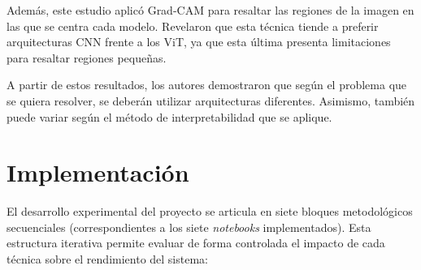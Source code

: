\documentclass[11pt, a4paper]{article}
\numberwithin{equation}{section}
\begin{document}
Además, este estudio aplicó Grad-CAM para resaltar las regiones de la imagen en las que se centra cada modelo. Revelaron que esta técnica tiende a preferir arquitecturas CNN frente a los ViT, ya que esta última presenta limitaciones para resaltar regiones pequeñas.

A partir de estos resultados, los autores demostraron que según el problema que se quiera resolver, se deberán utilizar arquitecturas diferentes. Asimismo, también puede variar según el método de interpretabilidad que se aplique.


\newpage
\section{Implementación}

El desarrollo experimental del proyecto se articula en siete bloques metodológicos secuenciales (correspondientes a los siete \textit{notebooks} implementados). Esta estructura iterativa permite evaluar de forma controlada el impacto de cada técnica sobre el rendimiento del sistema:
\end{document}
